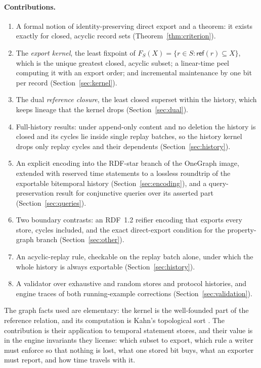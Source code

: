 \documentclass[11pt]{article}
\theoremstyle{plain}
\theoremstyle{definition}
\theoremstyle{remark}
\newcommand{\refset}{\mathsf{ref}}
\begin{document}
\paragraph{Contributions.}
\begin{enumerate}
\item A formal notion of identity-preserving direct export and a theorem: it exists
exactly for closed, acyclic record sets (Theorem~\ref{thm:criterion}).
\item The \emph{export kernel}, the least fixpoint of
$F_S(X)=\{r\in S:\refset(r)\subseteq X\}$, which is the unique greatest closed,
acyclic subset; a linear-time peel computing it with an export order; and
incremental maintenance by one bit per record (Section~\ref{sec:kernel}).
\item The dual \emph{reference closure}, the least closed superset within the
history, which keeps lineage that the kernel drops (Section~\ref{sec:dual}).
\item Full-history results: under append-only content and no deletion the history is
closed and its cycles lie inside single replay batches, so the history kernel drops
only replay cycles and their dependents (Section~\ref{sec:history}).
\item An explicit encoding into the RDF-star branch of the OneGraph image, extended
with reserved time statements to a lossless roundtrip of the exportable bitemporal
history (Section~\ref{sec:encoding}), and a query-preservation result for
conjunctive queries over its asserted part (Section~\ref{sec:queries}).
\item Two boundary contrasts: an RDF~1.2 reifier encoding that exports every store,
cycles included, and the exact direct-export condition for the property-graph
branch (Section~\ref{sec:other}).
\item An acyclic-replay rule, checkable on the replay batch alone, under which the
whole history is always exportable (Section~\ref{sec:history}).
\item A validator over exhaustive and random stores and protocol histories, and
engine traces of both running-example corrections (Section~\ref{sec:validation}).
\end{enumerate}
The graph facts used are elementary: the kernel is the well-founded part of the
reference relation, and its computation is Kahn's topological sort
\cite{kahn1962topological}. The contribution is their application to temporal
statement stores, and their value is in the engine invariants they license: which
subset to export, which rule a writer must enforce so that nothing is lost, what one
stored bit buys, what an exporter must report, and how time travels with it.
\end{document}
